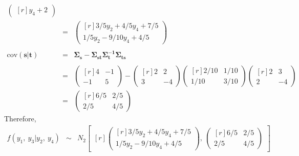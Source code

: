 \documentclass[12pt]{article} %
\begin{document}
\begin{enumerate}
\begin{enumerate}
\begin{enumerate}
\begin{eqnarray*}
\begin{pmatrix}[r]
						y_{4}+2
						\end{pmatrix}\\
					&=&
					\begin{pmatrix}[r]
					3/5y_{2}+4/5y_{4}+7/5 \\
					1/5y_{2}-9/10y_{4}+4/5
					\end{pmatrix}\\
					\\
				\mathrm{cov}(\mathbf{s|t}) &=& 
				\mathbf{\Sigma_{\mathbf{s}}-\Sigma_{\mathbf{st}}\Sigma_{\mathbf{t}}^{-1}\Sigma_{\mathbf{ts}}}\\
				\\
				&=&
				\begin{pmatrix}[r]
					4 & -1 \\
				   -1 & 5			 
				\end{pmatrix}-				
				\begin{pmatrix}[r]
					2 &  2 \\
					3  &-4 
				\end{pmatrix}
				\begin{pmatrix}[r]
					2/10 & 1/10	\\
					1/10 & 3/10				
				\end{pmatrix}
				\begin{pmatrix}[r]
					 2 & 3 \\
					 2 & -4
				\end{pmatrix}\\
				&=&
				\begin{pmatrix}[r]
					6/5 & 2/5 \\
					2/5 & 4/5
				\end{pmatrix}
				\end{eqnarray*}
				Therefore, 
				\begin{eqnarray*}
					f(y_{1},~y_{3} | y_{2},~y_{4})&\sim&
					N_{2}
					\begin{bmatrix}[r]
						\begin{pmatrix}[r]
							3/5y_{2}+4/5y_{4}+7/5 \\
							1/5y_{2}-9/10y_{4}+4/5							
						\end{pmatrix},~
						\begin{pmatrix}[r]
							6/5 & 2/5 \\
							2/5 & 4/5
						\end{pmatrix}
					\end{bmatrix}
				\end{eqnarray*}
			\end{enumerate}
					

\end{enumerate}
\end{enumerate}
\end{document}
